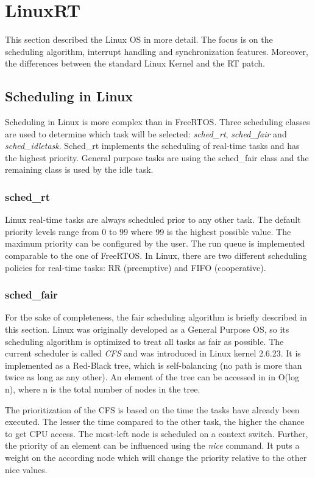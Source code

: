 \section{LinuxRT}
This section described the Linux \ac{OS} in more detail.
The focus is on the scheduling algorithm, interrupt handling and synchronization features.
Moreover, the differences between the standard Linux Kernel and the RT patch.

\subsection{Scheduling in Linux}\label{ss_scheduling_in_linux} 
Scheduling in Linux \cite{love:lkd} \cite{jones:itlcfss} is more complex than in FreeRTOS.
Three scheduling classes are used to determine which task will be selected: \textit{sched\_rt}, \textit{sched\_fair} and \textit{sched\_idletask}.
Sched\_rt implements the scheduling of real-time tasks and has the highest priority. 
General purpose tasks are using the sched\_fair class and the remaining class is used by the idle task.

\subsubsection{sched\_rt} 
Linux real-time tasks are always scheduled prior to any other task. 
The default priority levels range from 0 to 99 where 99 is the highest possible value.
The maximum priority can be configured by the user. 
The run queue is implemented comparable to the one of FreeRTOS. 
In Linux, there are two different scheduling policies for real-time tasks: \ac{RR} (preemptive) and \ac{FIFO} (cooperative).

\subsubsection{sched\_fair}
For the sake of completeness, the fair scheduling algorithm is briefly described in this section.
Linux was originally developed as a General Purpose \ac{OS}, so its scheduling algorithm is optimized to treat all tasks as fair as possible. 
The current scheduler is called \textit{\ac{CFS}} and was introduced in Linux kernel 2.6.23.
It is implemented as a Red-Black tree, which is self-balancing (no path is more than twice as long as any other).
An element of the tree can be accessed in in O(log n), where n is the total number of nodes in the tree.
\par
The prioritization of the \ac{CFS} is based on the time the tasks have already been executed. 
The lesser the time compared to the other task, the higher the chance to get \ac{CPU} access.
The most-left node is scheduled on a context switch.
Further, the priority of an element can be influenced using the \textit{nice} command. 
It puts a weight on the according node which will change the priority relative to the other nice values.

